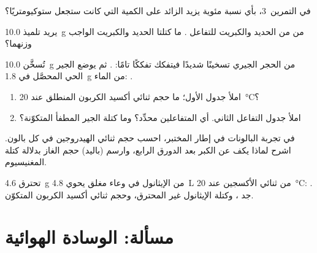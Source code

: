 \begin{exercise}[$\star\star$]\label{exo:g10:reaction-progress-table:11}
في التمرين~3، بأي نسبة مئوية يزيد  الزائد على الكمية التي كانت
ستجعل  ستوكيومتريًا؟
\end{exercise}

\begin{exercise}[$\star\star\star$]\label{exo:g10:reaction-progress-table:12}
يريد تلميذ \qty{10.0}{g} من  من الحديد والكبريت للتفاعل
. ما كتلتا الحديد والكبريت الواجب
وزنهما؟
\end{exercise}

\begin{exercise}[$\star\star\star$]\label{exo:g10:reaction-progress-table:13}
تُسخَّن \qty{10.0}{g} من الحجر الجيري  تسخينًا شديدًا فيتفكك
تفككًا تامًا: . ثم يوضع الجير الحي  المحصَّل
في \qty{1.8}{g} من الماء: .
\begin{enumerate}
  \item املأ جدول  الأول؛ ما حجم ثنائي أكسيد الكربون المنطلق
        عند \qty{20}{\celsius}؟
  \item املأ جدول التفاعل الثاني. أي المتفاعلين محدِّد؟ وما كتلة الجير
        المطفأ  المتكوّنة؟
\end{enumerate}
\end{exercise}

\begin{exercise}[$\star\star\star$]\label{exo:g10:reaction-progress-table:14}
في تجربة البالونات في إطار المختبر، احسب حجم ثنائي الهيدروجين في كل بالون.
اشرح لماذا يكف عن الكبر بعد الدورق الرابع، وارسم (باليد) حجم الغاز بدلالة كتلة
المغنيسيوم.
\end{exercise}

\begin{exercise}[$\star\star\star$]\label{exo:g10:reaction-progress-table:15}
تحترق \qty{4.6}{g} من الإيثانول  في وعاء مغلق يحوي
\qty{4.8}{L} من ثنائي الأكسجين عند \qty{20}{\celsius}:
. جد ، وكتلة الإيثانول
غير المحترق، وحجم ثنائي أكسيد الكربون المتكوّن.
\end{exercise}

\section{مسألة: الوسادة الهوائية}

